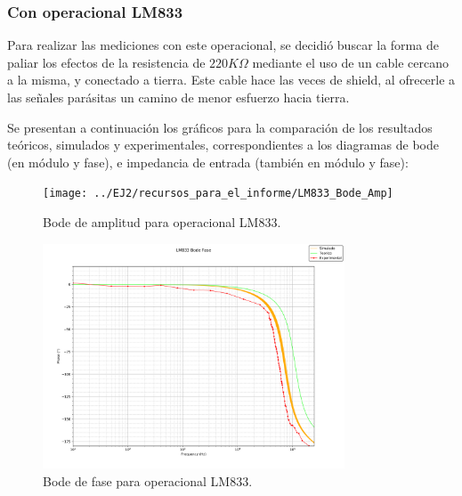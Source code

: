 \subsubsection{Con operacional LM833}
Para realizar las mediciones con este operacional, se decidió buscar la forma de paliar los efectos de la resistencia de $220K\Omega$ mediante el uso de un cable cercano a la misma, y conectado a tierra.
Este cable hace las veces de shield, al ofrecerle a las señales parásitas un camino de menor esfuerzo hacia tierra. \par
Se presentan a continuación los gráficos para la comparación de los resultados teóricos, simulados y experimentales, correspondientes a los diagramas de bode (en módulo y fase), e impedancia de entrada (también en módulo y fase):
\begin{figure}[H]
    \begin{minipage}{\textwidth}
        \centering
        \texttt{[image: ../EJ2/recursos\_para\_el\_informe/LM833\_Bode\_Amp]}
        \caption{Bode de amplitud para operacional LM833.}
        \label{fig:LM833_Bode_Amp}
    \end{minipage}\hfill
\end{figure}
\begin{figure}[H]
    \begin{minipage}{\textwidth}
        \centering
        \includegraphics[width=0.8\textwidth]{../EJ2/recursos_para_el_informe/LM833_Bode_Fase}
        \caption{Bode de fase para operacional LM833.}
        \label{fig:LM833_Bode_Fase}
    \end{minipage}\hfill
\end{figure}

